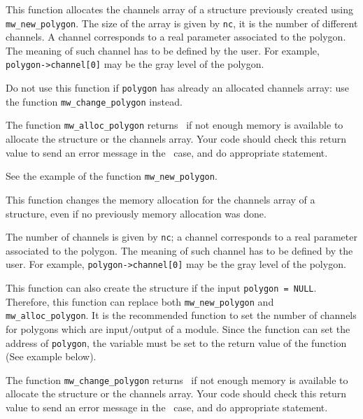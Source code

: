 \Description
This function allocates the channels array of a \polygon structure previously
created using \verb+mw_new_polygon+. The size of the array is given by 
\verb+nc+, it is the number of different channels.
A channel corresponds to a real parameter associated to the polygon. 
The meaning of such channel has to be defined by the user. 
For example, \verb+polygon->channel[0]+ may be the gray level of the polygon.

Do not use this function if \verb+polygon+ has already an allocated channels array: use the function \verb+mw_change_polygon+ instead.

The function \verb+mw_alloc_polygon+ returns \Null\ if not enough memory is available to allocate the structure or the channels array. 
Your code should check this return value to send an error message in the \Null\ case, and do appropriate statement.

\Next
\Example
See the example of the function \verb+mw_new_polygon+.

\newpage %


\Description
This function changes the memory allocation for the channels array of
a \polygon structure, even if no previously memory allocation was done. 

The number of channels is given by \verb+nc+; a channel corresponds to
a real parameter associated to the polygon. The meaning of such channel
has to be defined by the user. For example, \verb+polygon->channel[0]+ may be the gray level of the polygon.

This function can also create the structure if the input \verb+polygon = NULL+.
Therefore, this function can replace both \verb+mw_new_polygon+ and
\verb+mw_alloc_polygon+. 
It is the recommended function to set the number of channels for polygons which are input/output of a module.
Since the function can set the address of \verb+polygon+, the variable must be set to the return value of the function (See example below).

The function \verb+mw_change_polygon+ returns \Null\ if not enough memory is available to allocate the structure or the channels array. 
Your code should check this return value to send an error message in the \Null\ case, and do appropriate statement.

